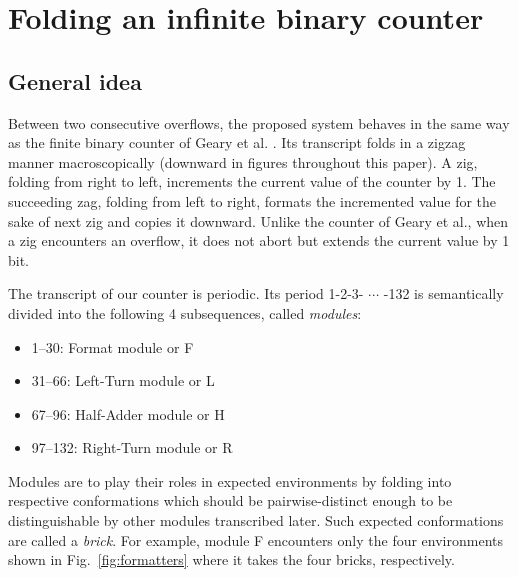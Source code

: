 \documentclass[runningheads]{llncs}
\begin{document}
\section{Folding an infinite binary counter}

\subsection{General idea}
Between two consecutive overflows, the proposed system behaves in the same way as the finite binary counter of Geary et al. \cite{GeMeScSe2019}.
Its transcript folds in a zigzag manner macroscopically (downward in figures throughout this paper).
A zig, folding from right to left, increments the current value of the counter by 1.
The succeeding zag, folding from left to right, formats the incremented value for the sake of next zig and copies it downward.
Unlike the counter of Geary et al., when a zig encounters an overflow, it does not abort but extends the current value by 1 bit.



The transcript of our counter is periodic.
Its period 1-2-3- $\cdots$ -132 is semantically divided into the following 4 subsequences, called \textit{modules}:
\begin{itemize}
\item 1--30: Format module or F
\item 31--66: Left-Turn module or L
\item 67--96: Half-Adder module or H
\item 97--132: Right-Turn module  or R
\end{itemize}
Modules are to play their roles in expected environments by folding into respective conformations which should be pairwise-distinct enough to be distinguishable by other modules transcribed later.
Such expected conformations are called a \textit{brick}.
For example, module F encounters only the four environments shown in Fig.~\ref{fig:formatters} where it takes the four bricks, respectively.
\end{document}
